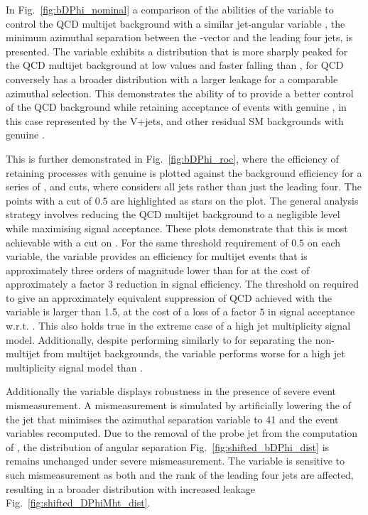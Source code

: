 In Fig.~\ref{fig:bDPhi_nominal} a comparison of the abilities of the \bdphi variable to 
control the QCD multijet background with 
a similar jet-\mht angular variable \dphimhtj, the minimum azimuthal separation between the \mht-vector and the leading four
jets, is presented. The \bdphi variable exhibits a distribution that
is more sharply peaked for the QCD multijet background 
at low values and faster falling than \dphimhtj,  \dphimhtj for QCD conversely has a broader 
distribution with a larger leakage for a comparable azimuthal
selection. This demonstrates the ability of \bdphi to provide a better
control of the QCD background while retaining acceptance of events with genuine \mht,
in this case represented by the V+jets, \ttbar and other residual SM
backgrounds with genuine \met. 

This is
further demonstrated in Fig.~\ref{fig:bDPhi_roc}, where the efficiency
of retaining processes with genuine \mht is plotted against the
background efficiency for a series of \bdphi, \dphimhtj and
\dphimhtjall cuts, where \dphimhtjall considers all jets rather than
just the leading four. The
points with a cut of $0.5$ are highlighted as stars on the plot. The
general analysis strategy involves reducing the QCD multijet
background to a negligible level while maximising signal acceptance. These plots demonstrate that this is
most achievable with a cut on \bdphi. For the same threshold
requirement of $0.5$ on each variable, the \bdphi variable provides an
efficiency for multijet events that is approximately three orders of
magnitude lower than for \dphimhtj at the cost of approximately a factor $3$
reduction in signal efficiency. The threshold on \bdphi required to give
an approximately equivalent suppression of QCD achieved with the
\dphimhtj
variable is larger than 1.5, at the cost of a loss of a factor $5$ in
signal acceptance w.r.t. \bdphi. This also holds true in the extreme
case of a high jet multiplicity signal model. Additionally, despite
performing similarly to \bdphi for separating the non-multijet from
multijet backgrounds, the \dphimhtjall variable performs worse for a
high jet multiplicity signal model than \bdphi.

Additionally the \bdphi variable displays robustness in the 
presence of severe event mismeasurement. A mismeasurement is simulated by artificially lowering 
the \pt of the jet that minimises the azimuthal separation variable to 41 \GeV and the event 
variables recomputed. Due to the removal of the probe jet from the computation of \bdphi, the 
distribution of angular separation Fig.~\ref{fig:shifted_bDPhi_dist} is 
remains unchanged under severe mismeasurement. The \dphimhtj variable is
 sensitive to such mismeasurement as both \mht and the rank of the 
leading four jets are affected, resulting in a broader distribution with
increased leakage Fig.~\ref{fig:shifted_DPhiMht_dist}.

